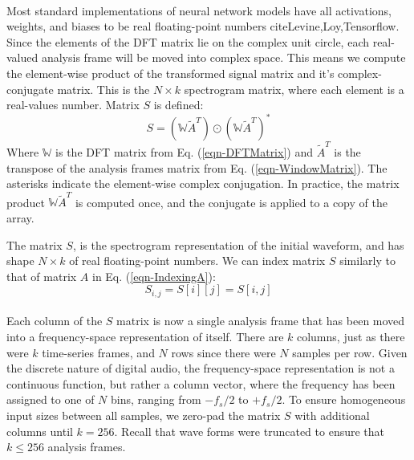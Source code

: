 \documentclass[12pt,letterpaper]{article}
\begin{document}
\paragraph*{}Most standard implementations of neural network models have all activations, weights, and biases to be real floating-point numbers cite{Levine,Loy,Tensorflow}. Since the elements of the DFT matrix lie on the complex unit circle, each real-valued analysis frame will be moved into complex space. This means we compute the element-wise product of the transformed signal matrix and it's complex-conjugate matrix. This is the $N \times k$
spectrogram matrix, where each element is a real-values number. Matrix $S$ is defined:
\begin{equation}
\label{eqn-Spectrogram}
S = (\mathbb{W}\widetilde{A}^T) \odot (\mathbb{W}\widetilde{A}^T)^*
\end{equation}
Where $\mathbb{W}$ is the DFT matrix from Eq. (\ref{eqn-DFTMatrix}) and $\widetilde{A}^T$ is the transpose of the analysis frames matrix from Eq. (\ref{eqn-WindowMatrix}). The asterisks indicate the element-wise complex conjugation. In practice, the matrix product $\mathbb{W}\widetilde{A}^T$ is computed once, and the conjugate is applied to a copy of the array.

The matrix $S$, is the spectrogram representation of the initial waveform, and has shape $N \times k$ of real floating-point numbers. We can index matrix $S$ similarly to that of matrix $A$ in Eq. (\ref{eqn-IndexingA}):
\begin{equation}
\label{eqn-IndexingS}
S_{i,j} = S[i][j] = S[i,j]
\end{equation}

\paragraph*{}Each column of the $S$ matrix is now a single analysis frame that has been moved into a frequency-space representation of itself. There are $k$ columns, just as there were $k$ time-series frames, and $N$ rows since there were $N$ samples per row. Given the discrete nature of digital audio, the frequency-space representation is not a continuous function, but rather a column vector, where the frequency has been assigned to one of $N$ bins, ranging from $-f_s / 2$ to $+f_s/2$. To ensure homogeneous input sizes between all samples, we zero-pad the matrix $S$ with additional columns until $k = 256$. Recall that wave forms were truncated to ensure that $k \leq 256$ analysis frames.
\end{document}
